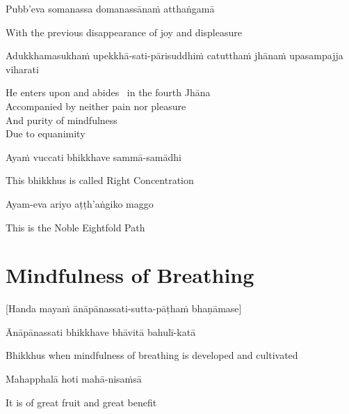 Pubb’eva somanassa domanassānaṁ atthaṅgamā

\begin{english}
  With the previous disappearance of joy and displeasure
\end{english}

Adukkhamasukhaṁ upekkhā-sati-pārisuddhiṁ catutthaṁ jhānaṁ upasampajja viharati

\begin{english}
  He enters upon and abides \breathmark\ in the fourth Jhāna\\
  Accompanied by neither pain nor pleasure\\
  And purity of mindfulness\\
  Due to equanimity
\end{english}

Ayaṁ vuccati bhikkhave sammā-samādhi

\begin{english}
  This bhikkhus is called Right Concentration
\end{english}

Ayam-eva ariyo aṭṭh'aṅgiko maggo

\begin{english}
  This is the Noble Eightfold Path
\end{english}

\suttaRef{[SN 45.8]}


\section{Mindfulness of Breathing}
\label{mindfulness-of-breathing}

\begin{center}
  [Handa mayaṁ ānāpānassati-sutta-pāṭhaṁ bhaṇāmase]
\end{center}

Ānāpānassati bhikkhave bhāvitā bahulī-katā

\begin{english}
  Bhikkhus when mindfulness of breathing is developed and cultivated
\end{english}

Mahapphalā hoti mahā-nisaṁsā

\begin{english}
  It is of great fruit and great benefit
\end{english}

